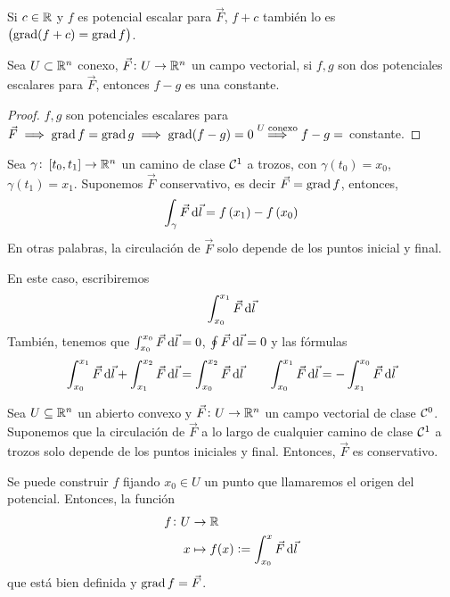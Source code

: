 \begin{obs}
    Si $c \in \mathbb{R}$ y $f$ es potencial escalar para $\vec{F}$, $f+c$ tambi\'en lo es $\left( \operatorname{grad}(f+c)=\operatorname{grad} f \right)$.
\end{obs}

\begin{prop*}
    Sea $U \subset \mathbb{R}^n$ conexo, $\vec{F} \colon U \to \mathbb{R}^n$ un campo vectorial, si $f,g$ son dos potenciales escalares para $\vec{F}$, entonces
    $f - g$ es una constante.
\end{prop*}
\begin{proof}
    $f,g$ son potenciales escalares para $\vec{F} \implies \operatorname{grad} f = \operatorname{grad} g \implies \operatorname{grad} (f-g) = 0 \stackrel{U \text{ conexo}}{\implies} f-g =$ constante.
\end{proof}

\begin{obs}
    Sea $\gamma \colon \left[ t_0, t_1 \right] \to \mathbb{R}^n$ un camino de clase $\mathcal{C}^1$ a trozos, con $\gamma\left( t_0 \right) = x_0$, $\gamma\left( t_1 \right)=x_1$.
    Suponemos $\vec{F}$ conservativo, es decir $\vec{F} = \operatorname{grad} f$, entonces,
    \[
        \int_\gamma \vec{F} \dif \vec{l} = f\left( x_1 \right) - f\left( x_0 \right)
    \]
    En otras palabras, la circulación de $\vec{F}$ solo depende de los puntos inicial y final.
    
    En este caso, escribiremos
    \[
        \int^{x_1}_{x_0} \vec{F} \dif \vec{l}
    \]
    Tambi\'en, tenemos que $\int^{x_0}_{x_0} \vec{F} \dif \vec{l} = 0$, $\oint \vec{F} \dif \vec{l} = 0$ y las fórmulas
    \[
        \int^{x_1}_{x_0} \vec{F} \dif \vec{l} + \int^{x_2}_{x_1} \vec{F} \dif \vec{l} = \int^{x_2}_{x_0} \vec{F} \dif \vec{l}
        \qquad
        \int^{x_1}_{x_0} \vec{F} \dif \vec{l} = - \int^{x_0}_{x_1} \vec{F} \dif \vec{l}
    \]
\end{obs}

\begin{prop}
    Sea $U \subseteq \mathbb{R}^n$ un abierto convexo y $\vec{F} \colon U \to \mathbb{R}^n$ un campo vectorial de clase $\mathcal{C}^0$. Suponemos que la circulación de $\vec{F}$
    a lo largo de cualquier camino de clase $\mathcal{C}^1$ a trozos solo depende de los puntos iniciales y final. Entonces, $\vec{F}$ es conservativo.
\end{prop}

\begin{obs*}
    Se puede construir $f$ fijando $x_0 \in U$ un punto que llamaremos el origen del potencial. Entonces, la función
    \[
        \begin{aligned}
            f \colon U &\to \real \\ x &\mapsto f(x) := \int^{x}_{x_0} \vec{F} \dif \vec{l}
        \end{aligned}
    \]
    que está bien definida y $\operatorname{grad} f = \vec{F}$.
\end{obs*}

